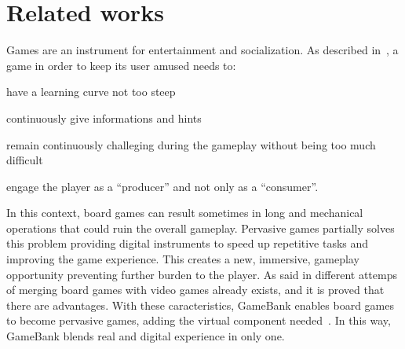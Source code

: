 \section{Related works}
\label{related_works}

Games are an instrument for entertainment and socialization. As described 
in~\cite{gee03}, a game in order to keep its user amused needs to:
\begin{enumerate*}[label=\roman*)]
 \item have a learning curve not too steep
 \item continuously give informations and hints
 \item remain continuously challeging during the gameplay without being too much
difficult
 \item engage the player as a ``producer'' and not only as a ``consumer''.
\end{enumerate*}
In this context, board games can result sometimes in long and mechanical 
operations that could ruin the overall gameplay. Pervasive games partially 
solves this problem providing digital instruments to speed up repetitive 
tasks and improving the game experience. This creates a new, immersive, 
gameplay opportunity preventing further burden to the player.
As said in\cite{mandryk02} different attemps of merging board games with video 
games already exists, and it is proved that there are advantages.
With these caracteristics, GameBank enables board games to become pervasive 
games, adding the virtual component needed~\cite{arango17}. 
In this way, GameBank blends real and digital experience in only one.

